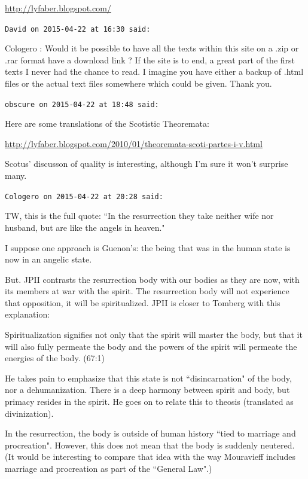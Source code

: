 \begin{footnotesize}
\begin{sffamily}
\url{http://lyfaber.blogspot.com/}


\hfill

\texttt{David on 2015-04-22 at 16:30 said: }

Cologero : Would it be possible to have all the texts within this site on a .zip or .rar format have a download link ? If the site is to end, a great part of the first texts I never had the chance to read. I imagine you have either a backup of .html files or the actual text files somewhere which could be given. Thank you.


\hfill

\texttt{obscure on 2015-04-22 at 18:48 said: }

Here are some translations of the Scotistic Theoremata:

\url{http://lyfaber.blogspot.com/2010/01/theoremata-scoti-partes-i-v.html}

Scotus' discusson of quality is interesting, although I'm sure it won't surprise many.


\hfill

\texttt{Cologero on 2015-04-22 at 20:28 said: }

TW, this is the full quote: ``In the resurrection they take neither wife nor husband, but are like the angels in heaven."

I suppose one approach is Guenon's: the being that was in the human state is now in an angelic state.

But. JPII contrasts the resurrection body with our bodies as they are now, with its members at war with the spirit. The resurrection body will not experience that opposition, it will be spiritualized. JPII is closer to Tomberg with this explanation:

\begin{quotex}
Spiritualization signifies not only that the spirit will master the body, but that it will also fully permeate the body and the powers of the spirit will permeate the energies of the body. (67:1) 

\end{quotex}
He takes pain to emphasize that this state is not ``disincarnation" of the body, nor a dehumanization. There is a deep harmony between spirit and body, but primacy resides in the spirit. He goes on to relate this to theosis (translated as divinization).

In the resurrection, the body is outside of human history ``tied to marriage and procreation". However, this does not mean that the body is suddenly neutered. (It would be interesting to compare that idea with the way Mouravieff includes marriage and procreation as part of the ``General Law".)



\end{sffamily}
\end{footnotesize}
